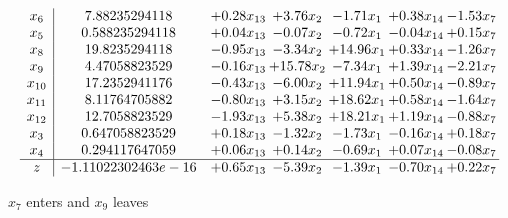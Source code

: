\documentclass[9pt]{article}
\begin{document}
 \[\begin{array}{c| c c@{\hskip 2pt} c@{\hskip 2pt} c@{\hskip 2pt} c@{\hskip 2pt} c@{\hskip 2pt} }
 x_{6}   &  7.88235294118 & +  0.28 x_{13} & +  3.76 x_{2} & -1.71 x_{1} & +  0.38 x_{14} & -1.53 x_{7}\\
 x_{5}   &  0.588235294118 & +  0.04 x_{13} & -0.07 x_{2} & -0.72 x_{1} & -0.04 x_{14} & +  0.15 x_{7}\\
 x_{8}   &  19.8235294118 & -0.95 x_{13} & -3.34 x_{2} & + 14.96 x_{1} & +  0.33 x_{14} & -1.26 x_{7}\\
 x_{9}   &  4.47058823529 & -0.16 x_{13} & + 15.78 x_{2} & -7.34 x_{1} & +  1.39 x_{14} & -2.21 x_{7}\\
 x_{10}   &  17.2352941176 & -0.43 x_{13} & -6.00 x_{2} & + 11.94 x_{1} & +  0.50 x_{14} & -0.89 x_{7}\\
 x_{11}   &  8.11764705882 & -0.80 x_{13} & +  3.15 x_{2} & + 18.62 x_{1} & +  0.58 x_{14} & -1.64 x_{7}\\
 x_{12}   &  12.7058823529 & -1.93 x_{13} & +  5.38 x_{2} & + 18.21 x_{1} & +  1.19 x_{14} & -0.88 x_{7}\\
 x_{3}   &  0.647058823529 & +  0.18 x_{13} & -1.32 x_{2} & -1.73 x_{1} & -0.16 x_{14} & +  0.18 x_{7}\\
 x_{4}   &  0.294117647059 & +  0.06 x_{13} & +  0.14 x_{2} & -0.69 x_{1} & +  0.07 x_{14} & -0.08 x_{7}\\
\hline
z    &  -1.11022302463e-16 & +  0.65 x_{13} & -5.39 x_{2} & -1.39 x_{1} & -0.70 x_{14} & +  0.22 x_{7}\\
\end{array}\]


 $ x_{7} $ enters and $ x_{9} $ leaves 
\end{document}
